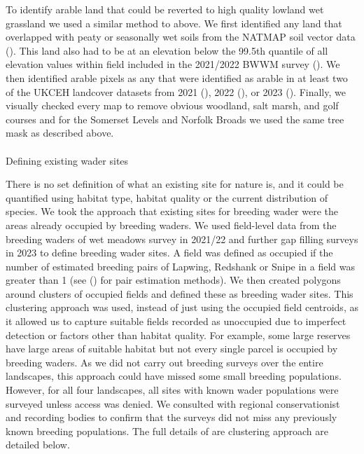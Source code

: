 \documentclass[
  12pt,
  letterpaper,
  DIV=11,
  numbers=noendperiod]{scrartcl}
\makeatletter
\let\oldparagraph\paragraph
\renewcommand{\paragraph}{
    \@ifstar
      \xxxParagraphStar
      \xxxParagraphNoStar
  }
\newcommand{\xxxParagraphStar}[1]{\oldparagraph*{#1}\mbox{}}
\newcommand{\xxxParagraphNoStar}[1]{\oldparagraph{#1}\mbox{}}
\makeatother
\begin{document}
To identify arable land that could be reverted to high quality lowland
wet grassland we used a similar method to above. We first identified any
land that overlapped with peaty or seasonally wet soils from the NATMAP
soil vector data (). This land also
had to be at an elevation below the 99.5th quantile of all elevation
values within field included in the 2021/2022 BWWM survey
(). We then identified arable
pixels as any that were identified as arable in at least two of the
UKCEH landcover datasets from 2021 (), 2022 (),
or 2023 (). Finally, we
visually checked every map to remove obvious woodland, salt marsh, and
golf courses and for the Somerset Levels and Norfolk Broads we used the
same tree mask as described above.

\paragraph{Defining existing wader
sites}\label{defining-existing-wader-sites}

There is no set definition of what an existing site for nature is, and
it could be quantified using habitat type, habitat quality or the
current distribution of species. We took the approach that existing
sites for breeding wader were the areas already occupied by breeding
waders. We used field-level data from the breeding waders of wet meadows
survey in 2021/22 and further gap filling surveys in 2023 to define
breeding wader sites. A field was defined as occupied if the number of
estimated breeding pairs of Lapwing, Redshank or Snipe in a field was
greater than 1 (see () for
pair estimation methods). We then created polygons around clusters of
occupied fields and defined these as breeding wader sites. This
clustering approach was used, instead of just using the occupied field
centroids, as it allowed us to capture suitable fields recorded as
unoccupied due to imperfect detection or factors other than habitat
quality. For example, some large reserves have large areas of suitable
habitat but not every single parcel is occupied by breeding waders. As
we did not carry out breeding surveys over the entire landscapes, this
approach could have missed some small breeding populations. However, for
all four landscapes, all sites with known wader populations were
surveyed unless access was denied. We consulted with regional
conservationist and recording bodies to confirm that the surveys did not
miss any previously known breeding populations. The full details of are
clustering approach are detailed below.
\end{document}
